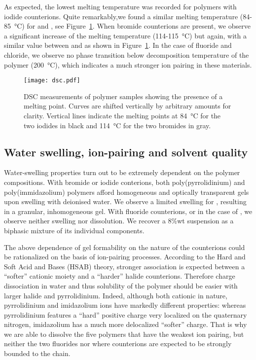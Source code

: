 \documentclass[journal=jacsat,manuscript=article]{achemso}
\begin{document}
As expected, the lowest melting temperature was recorded for polymers with iodide counterions. Quite remarkably,we found a similar melting temperature (84-\SI{85}{\celsius}) for  and , see Figure~\ref{fig:dsc}. When bromide counterions are present, we observe a significant increase of the melting temperature (114-\SI{115}{\celsius}) but again, with a similar value between  and  as shown in Figure~\ref{fig:dsc}. In the case of fluoride and chloride, we observe no phase transition below decomposition temperature of the polymer (\SI{200}{\celsius}), which indicates a much stronger ion pairing in these materials.

\begin{figure}
\texttt{[image: dsc.pdf]}
\caption{DSC measurements of polymer samples showing the presence of a melting point. Curves are shifted vertically by arbitrary amounts for clarity. Vertical lines indicate the melting points at \SI{84}{\celsius} for the two iodides in black and \SI{114}{\celsius} for the two bromides in gray.}
\label{fig:dsc}
\end{figure}

\subsection{Water swelling, ion-pairing and solvent quality}
Water-swelling properties turn out to be extremely dependent on the polymer compositions. With bromide or iodide conterions, both poly(pyrrolidinium) and poly(immidazolium) polymers afford homogeneous and optically transparent gels upon swelling with deionised water. We observe a limited swelling for , resulting in a granular, inhomogeneous gel. With fluoride counterions, or in the case of , we observe neither swelling nor dissolution. We recover a 8\%wt suspension as a biphasic mixture of its individual components.

The above dependence of gel formability on the nature of the counterions could be rationalized on the basis of ion-pairing processes. According to the Hard and Soft Acid and Bases (HSAB) theory, stronger association is expected between a ``softer'' cationic moiety and a ``harder'' halide counterions\cite{Goossens2009}. Therefore charge dissociation in water and thus solubility of the polymer should be easier with larger halide and pyrrolidinium. Indeed, although both cationic in nature, pyrrolidinium and imidazolium ions have markedly different properties: whereas pyrrolidinium features a ``hard'' positive charge very localized on the quaternary nitrogen, imidazolium has a much more delocalized ``softer'' charge. That is why we are able to dissolve the five polymers that have the weakest ion pairing, but neither the two fluorides nor  where counterions are expected to be strongly bounded to the chain.
\end{document}
